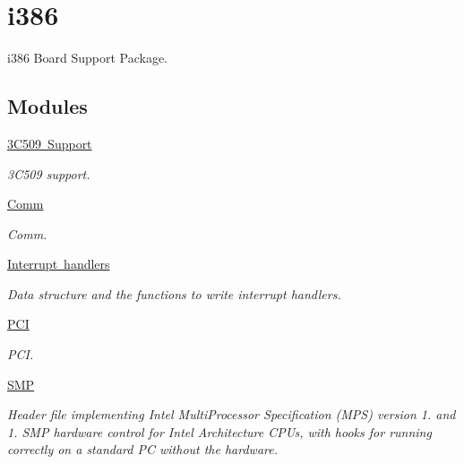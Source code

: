 \hypertarget{group__RTEMSBSPsI386}{}\section{i386}
\label{group__RTEMSBSPsI386}


i386 Board Support Package.  


\subsection*{Modules}
\begin{DoxyCompactItemize}
\item 
\mbox{\hyperlink{group__pc386__3c509}{3\+C509 Support}}
\begin{DoxyCompactList}\small\item\em 3C509 support. \end{DoxyCompactList}\item 
\mbox{\hyperlink{group__i386__comm}{Comm}}
\begin{DoxyCompactList}\small\item\em Comm. \end{DoxyCompactList}\item 
\mbox{\hyperlink{group__i386__irq}{Interrupt handlers}}
\begin{DoxyCompactList}\small\item\em Data structure and the functions to write interrupt handlers. \end{DoxyCompactList}\item 
\mbox{\hyperlink{group__i386__pci}{P\+CI}}
\begin{DoxyCompactList}\small\item\em P\+CI. \end{DoxyCompactList}\item 
\mbox{\hyperlink{group__i386__smp}{S\+MP}}
\begin{DoxyCompactList}\small\item\em Header file implementing Intel Multi\+Processor Specification (M\+PS) version 1. and 1. S\+MP hardware control for Intel Architecture C\+P\+Us, with hooks for running correctly on a standard PC without the hardware. \end{DoxyCompactList}\end{DoxyCompactItemize}
